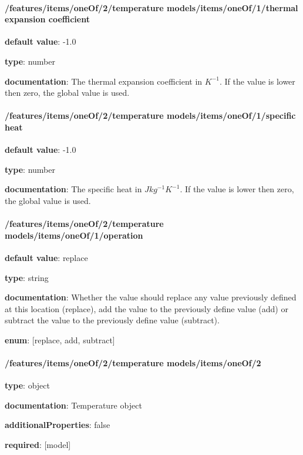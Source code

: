 \begin{itemized}
\end{itemized}\paragraph{/features/items/oneOf/2/temperature models/items/oneOf/1/thermal expansion coefficient} \begin{itemized}
\item {\bf default value}: -1.0
\item {\bf type}: number
\item {\bf documentation}: The thermal expansion coefficient in $K^{-1}$. If the value is lower then zero, the global value is used.
\end{itemized}\paragraph{/features/items/oneOf/2/temperature models/items/oneOf/1/specific heat} \begin{itemized}
\item {\bf default value}: -1.0
\item {\bf type}: number
\item {\bf documentation}: The specific heat in $J kg^{-1} K^{-1}$. If the value is lower then zero, the global value is used.
\end{itemized}\paragraph{/features/items/oneOf/2/temperature models/items/oneOf/1/operation} \begin{itemized}
\item {\bf default value}: replace
\item {\bf type}: string
\item {\bf documentation}: Whether the value should replace any value previously defined at this location (replace), add the value to the previously define value (add) or subtract the value to the previously define value (subtract).
\item {\bf enum}: [replace, add, subtract]\end{itemized}\paragraph{/features/items/oneOf/2/temperature models/items/oneOf/2} \begin{itemized}
\item {\bf type}: object
\item {\bf documentation}: Temperature object
\item {\bf additionalProperties}: false
\item {\bf required}: [model]\end{itemized}
